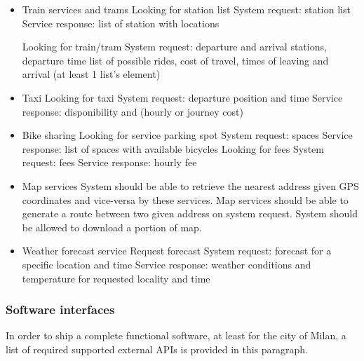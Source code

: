 \begin{itemize}
	\item Train services and trams
	\subitem Looking for station list
	\subsubitem System request: station list
	\subsubitem Service response: list of station with locations
	
	\subitem Looking for train/tram
	\subsubitem System request: departure and arrival stations, departure time
	\subsubitem list of possible rides, cost of travel, times of leaving and arrival (at least 1 list's element)
	
	\item Taxi
	\subitem Looking for taxi
	\subsubitem System request: departure position and time
	\subsubitem Service response: disponibility and (hourly or journey cost)
	
	\item Bike sharing
	\subitem Looking for service parking spot
	\subsubitem System request: spaces
	\subsubitem Service response: list of spaces with available bicycles
	\subitem Looking for fees
	\subsubitem System request: fees
	\subsubitem Service response: hourly fee
	
	\item Map services
	\subitem System should be able to retrieve the nearest address given GPS coordinates and vice-versa by these services.
	\subitem Map services should be able to generate a route between two given address on system request.
	\subitem System should be allowed to download a portion of map.
	
	\item Weather forecast service
	\subitem Request forecast
	\subsubitem System request: forecast for a specific location and time
	\subsubitem Service response: weather conditions and temperature for requested locality and time
	
	
\end{itemize}

\subsubsection{Software interfaces}

In order to ship a complete functional software, at least for the city of Milan, a list of required supported external APIs is provided in this paragraph.

